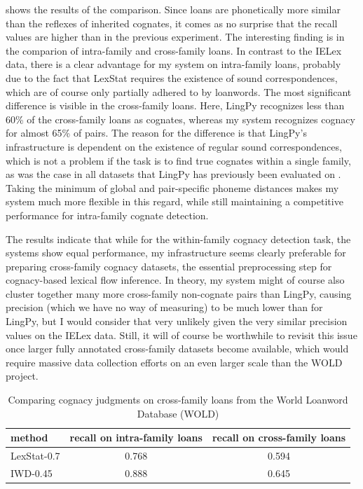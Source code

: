  shows the results of the comparison. Since loans are phonetically more similar than the reflexes of inherited cognates, it comes as no surprise that the recall values are higher than in the previous experiment. The interesting finding is in the comparion of intra-family and cross-family loans. In contrast to the IELex data, there is a clear advantage for my system on intra-family loans, probably due to the fact that LexStat requires the existence of sound correspondences, which are of course only partially adhered to by loanwords. The most significant difference is visible in the cross-family loans. Here, LingPy recognizes less than 60\% of the cross-family loans as cognates, whereas my system recognizes cognacy for almost 65\% of pairs. The reason for the difference is that LingPy's infrastructure is dependent on the existence of regular sound correspondences, which is not a problem if the task is to find true cognates within a single family, as was the case in all datasets
that LingPy has previously been evaluated on \citep{list_ea_2017}. Taking the minimum of global and pair-specific phoneme distances makes my system much more flexible in this regard, while still maintaining a competitive performance for intra-family cognate detection.

The results indicate that while for the within-family cognacy detection task, the systems show equal performance, my infrastructure seems clearly preferable for preparing cross-family cognacy datasets, the essential preprocessing step for cognacy-based lexical flow inference. In theory, my system might of course also cluster together many more cross-family non-cognate pairs than LingPy, causing precision (which we have no way of measuring) to be much lower than for LingPy, but I would consider that very unlikely given the very similar precision values on the IELex data. Still, it will of course be worthwhile to revisit this issue once larger fully annotated cross-family datasets become available, which would require massive data collection efforts on an even larger scale than the WOLD project.

\begin{table}
\centering
\begin{tabular}{lcc}
\hline \hline
method & recall on intra-family loans & recall on cross-family loans\\ \hline
LexStat-0.7 & 0.768 & 0.594\\
IWD-0.45 & 0.888 & 0.645\\
\hline
\end{tabular}
\caption{Comparing cognacy judgments on cross-family loans from the World Loanword Database (WOLD)}
\label{lingpyComparisonWOLD}
\end{table}

